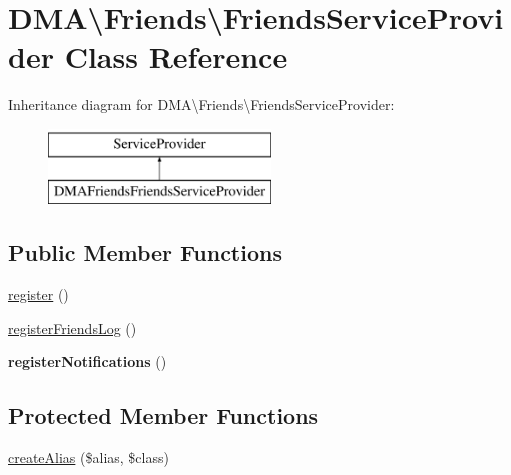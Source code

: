 \hypertarget{classDMA_1_1Friends_1_1FriendsServiceProvider}{\section{D\+M\+A\textbackslash{}Friends\textbackslash{}Friends\+Service\+Provider Class Reference}
\label{classDMA_1_1Friends_1_1FriendsServiceProvider}
}
Inheritance diagram for D\+M\+A\textbackslash{}Friends\textbackslash{}Friends\+Service\+Provider\+:\begin{figure}[H]
\begin{center}
\leavevmode
\includegraphics[height=2.000000cm]{df/d6d/classDMA_1_1Friends_1_1FriendsServiceProvider}
\end{center}
\end{figure}
\subsection*{Public Member Functions}
\begin{DoxyCompactItemize}
\item 
\hyperlink{classDMA_1_1Friends_1_1FriendsServiceProvider_a6a90d2cdc4c6b153b45764ba66e154ae}{register} ()
\item 
\hyperlink{classDMA_1_1Friends_1_1FriendsServiceProvider_a2d6ff7101ca6389c00e298f2d594a1df}{register\+Friends\+Log} ()
\item 
\hypertarget{classDMA_1_1Friends_1_1FriendsServiceProvider_a4a51f5a9c32c49373284c0b35f8dfd35}{{\bfseries register\+Notifications} ()}\label{classDMA_1_1Friends_1_1FriendsServiceProvider_a4a51f5a9c32c49373284c0b35f8dfd35}

\end{DoxyCompactItemize}
\subsection*{Protected Member Functions}
\begin{DoxyCompactItemize}
\item 
\hyperlink{classDMA_1_1Friends_1_1FriendsServiceProvider_acad52dc5020c640afed3c4fe82243051}{create\+Alias} (\$alias, \$class)
\end{DoxyCompactItemize}



